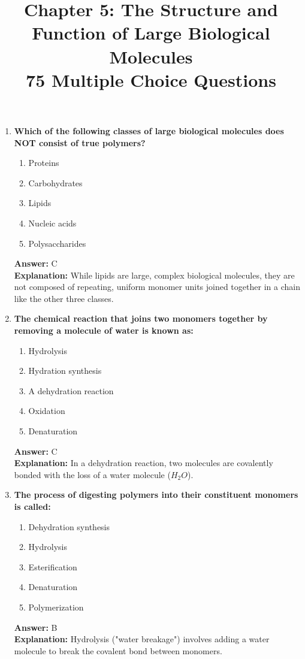 \documentclass[11pt, a4paper]{article}
\title{\textbf{Chapter 5: The Structure and Function of Large Biological Molecules \\ 75 Multiple Choice Questions}}
\author{}
\date{}
\begin{document}
\maketitle

\begin{enumerate}


\item \textbf{Which of the following classes of large biological molecules does NOT consist of true polymers?}
\begin{enumerate}[label=\Alph*.]
    \item Proteins
    \item Carbohydrates
    \item Lipids
    \item Nucleic acids
    \item Polysaccharides
\end{enumerate}
\textbf{Answer:} C \\
\textbf{Explanation:} While lipids are large, complex biological molecules, they are not composed of repeating, uniform monomer units joined together in a chain like the other three classes.

\item \textbf{The chemical reaction that joins two monomers together by removing a molecule of water is known as:}
\begin{enumerate}[label=\Alph*.]
    \item Hydrolysis
    \item Hydration synthesis
    \item A dehydration reaction
    \item Oxidation
    \item Denaturation
\end{enumerate}
\textbf{Answer:} C \\
\textbf{Explanation:} In a dehydration reaction, two molecules are covalently bonded with the loss of a water molecule ($H_2O$).

\item \textbf{The process of digesting polymers into their constituent monomers is called:}
\begin{enumerate}[label=\Alph*.]
    \item Dehydration synthesis
    \item Hydrolysis
    \item Esterification
    \item Denaturation
    \item Polymerization
\end{enumerate}
\textbf{Answer:} B \\
\textbf{Explanation:} Hydrolysis ("water breakage") involves adding a water molecule to break the covalent bond between monomers.


\end{enumerate}
\end{document}
